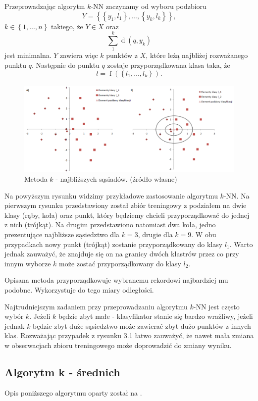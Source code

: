 \documentclass[12pt,a4paper]{report}
\newcommand{\set}[1]{\left\lbrace {#1} \right\rbrace}
\newcommand{\distance}[2]{\operatorname{d}\left({#1}, {#2} \right)}
\newcommand{\f}[2][]{\operatorname{f}\left( {#2} \right)_{#1}}
\begin{document}
Przeprowadzając algorytm $k$-NN zaczynamy od wyboru podzbioru
$$
\mathit{Y}=\set{\set{y_1,l_1},\ldots,\set{y_k,l_k}}, 
$$
$k\in\set{1,\ldots,n}$ takiego, że $\mathit{Y} \in \mathit{X}$ oraz 
$$
\sum_1^k \distance{q}{y_k}
$$ 
jest minimalna. $\mathit{Y}$ zawiera więc $k$ punktów z $\mathit{X}$, które leżą najbliżej rozważanego punktu $q$. Następnie do punktu $q$ zostaje przyporządkowana klasa taka, że $$
l=\f{\set{l_1,\ldots,l_k}}.
$$
\begin{center}
\begin{figure}[H]
\centering
\includegraphics[scale=0.5]{obrazy/kNN.PNG} 
\caption{Metoda $k$ - najbliższych sąsiadów. (źródło własne)}
\end{figure}
\end{center}

Na powyższym rysunku widzimy przykładowe zastosowanie algorytmu $k$-NN. Na pierwszym rysunku przedstawiony został zbiór treningowy z podziałem na dwie klasy (rąby, koła) oraz punkt, który będziemy chcieli przyporządkować do jednej z nich (trójkąt). Na drugim przedstawiono natomiast dwa koła, jedno prezentujące najbliższe sąsiedztwo dla $k = 3$, drugie dla $k = 9$. W obu przypadkach nowy punkt (trójkąt) zostanie przyporządkowany do klasy $l_1$. Warto jednak zauważyć, że znajduje się on na granicy dwóch klastrów przez co przy innym wyborze $k$ może zostać przyporządkowany do klasy $l_2$.

Opisana metoda przyporządkowuje wybranemu rekordowi najbardziej mu podobne. Wykorzystuje do tego miary odległości.

Najtrudniejszym zadaniem przy przeprowadzaniu algorytmu $k$-NN jest często wybór $k$. Jeżeli $k$ będzie zbyt małe - klasyfikator stanie się bardzo wrażliwy, jeżeli jednak $k$ będzie zbyt duże sąsiedztwo może zawierać zbyt dużo punktów z innych klas. Rozważając przypadek z rysunku 3.1 łatwo zauważyć, że nawet mała zmiana w obserwacjach zbioru treningowego może doprowadzić do zmiany wyniku.

\subsection{Algorytm k - średnich} 
Opis poniższego algorytmu oparty został na {\citep[Sec 2.3.1]{ascgdpds}}.
\end{document}
